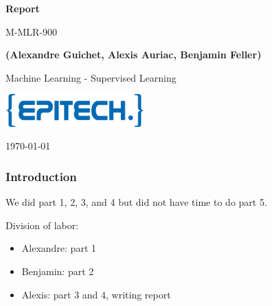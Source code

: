 \documentclass[10pt, a4paper]{article}
\newcommand\course{Machine Learning - Supervised Learning}
\newcommand\hwnumber{M-MLR-900}
\newcommand\Information{(Alexandre Guichet, Alexis Auriac, Benjamin Feller)}
\begin{document}
\begin{titlepage}
    \begin{center}
        \vspace*{3cm}
            
        \Huge
        \textbf{Report}
            
        \vspace{1cm}
        \huge
        \hwnumber
            
        \vspace{1.5cm}
        \Large
            
        \textbf{\Information}                      %
        
            
        \vfill
        
        \course
            
        \vspace{1cm}
            
        \includegraphics[width=0.4\textwidth]{epitech_logo.png}

        \Large
        
        \today
            
    \end{center}
\end{titlepage}

\newpage

\subsubsection*{Introduction}

We did part 1, 2, 3, and 4 but did not have time to do part 5.

Division of labor:
\begin{itemize}
    \item Alexandre: part 1
    \item Benjamin: part 2
    \item Alexis: part 3 and 4, writing report
\end{itemize}

\newpage
\end{document}
